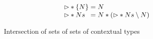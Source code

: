 \documentclass[sigplan,screen]{acmart}
\begin{document}
\begin{figure}[h]
  \[
    \begin{array}{l @{}l}
    \rhd * \{ N \}
    & {}= N
    \\
    \rhd * Ns
    & {}= N * (\rhd * Ns \setminus N)
    \end{array}
  \]

  \caption{Intersection of sets of sets of contextual types}
\end{figure}









\end{document}
